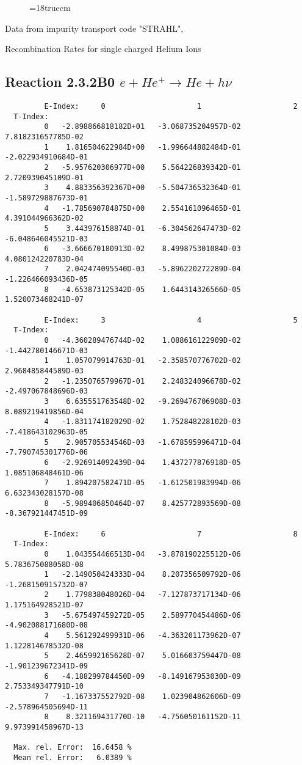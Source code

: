 \begin{figure} \label{2.6A0}
\epsfxsize=18truecm
\end{figure}
\newpage

Data from impurity transport code "STRAHL", \cite{kn:Behringer}

  Recombination Rates for single charged Helium Ions

\subsection{
Reaction 2.3.2B0  $e + He^+ \rightarrow He + h\nu$
}

\begin{verbatim}
         E-Index:     0                     1                     2
  T-Index:
         0   -2.898866818182D+01   -3.068735204957D-02    7.818231657785D-02
         1    1.816504622984D+00   -1.996644882484D-01   -2.022934910684D-01
         2   -5.957620306977D+00    5.564226839342D-01    2.720939045109D-01
         3    4.883356392367D+00   -5.504736532364D-01   -1.589729887673D-01
         4   -1.785690784875D+00    2.554161096465D-01    4.391044966362D-02
         5    3.443976158874D-01   -6.304562647473D-02   -6.048646045521D-03
         6   -3.666670180913D-02    8.499875301084D-03    4.080124220783D-04
         7    2.042474095540D-03   -5.896220272289D-04   -1.226466093436D-05
         8   -4.653873125342D-05    1.644314326566D-05    1.520073468241D-07

         E-Index:     3                     4                     5
  T-Index:
         0   -4.360289476744D-02    1.088616122909D-02   -1.442780146671D-03
         1    1.057079914763D-01   -2.358570776702D-02    2.968485844589D-03
         2   -1.235076579967D-01    2.248324096678D-02   -2.497067848696D-03
         3    6.635551763548D-02   -9.269476706908D-03    8.089219419856D-04
         4   -1.831174182029D-02    1.752848228102D-03   -7.418643102963D-05
         5    2.905705534546D-03   -1.678595996471D-04   -7.790745301776D-06
         6   -2.926914092439D-04    1.437277876918D-05    1.085106848461D-06
         7    1.894207582471D-05   -1.612501983994D-06    6.632343028157D-08
         8   -5.989406850464D-07    8.425772893569D-08   -8.367921447451D-09

         E-Index:     6                     7                     8
  T-Index:
         0    1.043554466513D-04   -3.878190225512D-06    5.783675088058D-08
         1   -2.149050424333D-04    8.207356509792D-06   -1.268150915732D-07
         2    1.779838048026D-04   -7.127873717134D-06    1.175164928521D-07
         3   -5.675497459272D-05    2.589770454486D-06   -4.902088171680D-08
         4    5.561292499931D-06   -4.363201173962D-07    1.122814678532D-08
         5    2.465992165628D-07    5.016603759447D-08   -1.901239672341D-09
         6   -4.188299784450D-09   -8.149167953030D-09    2.753349347791D-10
         7   -1.167337552792D-08    1.023904862606D-09   -2.578964505694D-11
         8    8.321169431770D-10   -4.756050161152D-11    9.973991458967D-13

  Max. rel. Error:  16.6458 %
  Mean rel. Error:   6.0389 %

\end{verbatim}
